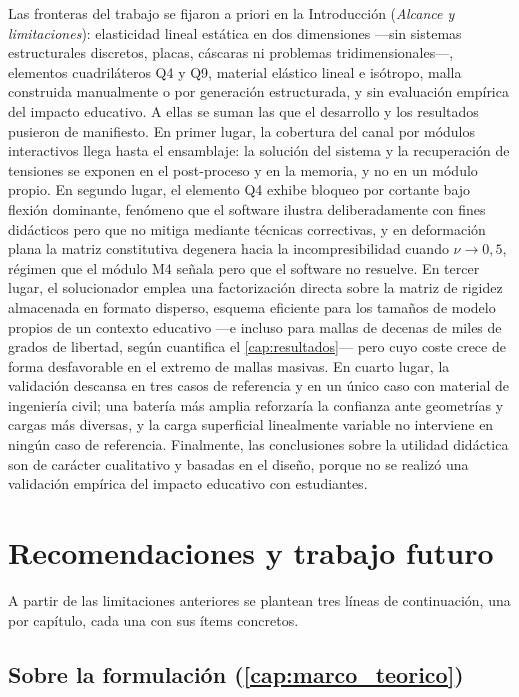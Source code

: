 Las fronteras del trabajo se fijaron a priori en la Introducción (\emph{Alcance y limitaciones}): elasticidad lineal estática en dos dimensiones —sin sistemas estructurales discretos, placas, cáscaras ni problemas tridimensionales—, elementos cuadriláteros Q4 y Q9, material elástico lineal e isótropo, malla construida manualmente o por generación estructurada, y sin evaluación empírica del impacto educativo. A ellas se suman las que el desarrollo y los resultados pusieron de manifiesto. En primer lugar, la cobertura del canal por módulos interactivos llega hasta el ensamblaje: la solución del sistema y la recuperación de tensiones se exponen en el post-proceso y en la memoria, y no en un módulo propio. En segundo lugar, el elemento Q4 exhibe bloqueo por cortante bajo flexión dominante, fenómeno que el software ilustra deliberadamente con fines didácticos pero que no mitiga mediante técnicas correctivas, y en deformación plana la matriz constitutiva degenera hacia la incompresibilidad cuando $\nu \to 0{,}5$, régimen que el módulo M4 señala pero que el software no resuelve. En tercer lugar, el solucionador emplea una factorización directa sobre la matriz de rigidez almacenada en formato disperso, esquema eficiente para los tamaños de modelo propios de un contexto educativo ---e incluso para mallas de decenas de miles de grados de libertad, según cuantifica el \autoref{cap:resultados}--- pero cuyo coste crece de forma desfavorable en el extremo de mallas masivas. En cuarto lugar, la validación descansa en tres casos de referencia y en un único caso con material de ingeniería civil; una batería más amplia reforzaría la confianza ante geometrías y cargas más diversas, y la carga superficial linealmente variable no interviene en ningún caso de referencia. Finalmente, las conclusiones sobre la utilidad didáctica son de carácter cualitativo y basadas en el diseño, porque no se realizó una validación empírica del impacto educativo con estudiantes.

\section*{Recomendaciones y trabajo futuro}

A partir de las limitaciones anteriores se plantean tres líneas de continuación, una por capítulo, cada una con sus ítems concretos.

\subsection*{Sobre la formulación (\autoref{cap:marco_teorico})}

